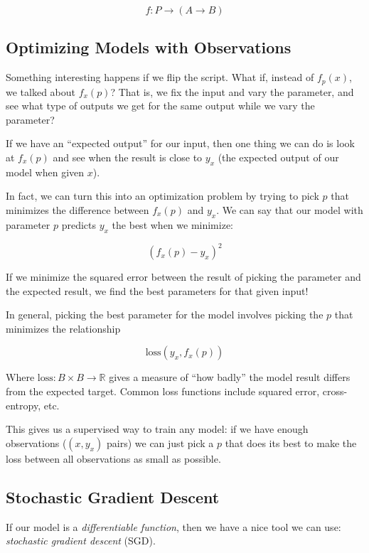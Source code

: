 \documentclass[]{article}
\begin{document}
\[
f : P \rightarrow (A \rightarrow B)
\]

\subsection{Optimizing Models with
Observations}\label{optimizing-models-with-observations}

Something interesting happens if we flip the script. What if, instead of
\(f_p(x)\), we talked about \(f_x(p)\)? That is, we fix the input and vary the
parameter, and see what type of outputs we get for the same output while we vary
the parameter?

If we have an ``expected output'' for our input, then one thing we can do is
look at \(f_x(p)\) and see when the result is close to \(y_x\) (the expected
output of our model when given \(x\)).

In fact, we can turn this into an optimization problem by trying to pick \(p\)
that minimizes the difference between \(f_x(p)\) and \(y_x\). We can say that
our model with parameter \(p\) predicts \(y_x\) the best when we minimize:

\[
(f_x(p) - y_x)^2
\]

If we minimize the squared error between the result of picking the parameter and
the expected result, we find the best parameters for that given input!

In general, picking the best parameter for the model involves picking the \(p\)
that minimizes the relationship

\[
\text{loss}(y_x, f_x(p))
\]

Where \(\text{loss} : B \times B \rightarrow \mathbb{R}\) gives a measure of
``how badly'' the model result differs from the expected target. Common loss
functions include squared error, cross-entropy, etc.

This gives us a supervised way to train any model: if we have enough
observations (\((x, y_x)\) pairs) we can just pick a \(p\) that does its best to
make the loss between all observations as small as possible.

\subsection{Stochastic Gradient Descent}\label{stochastic-gradient-descent}

If our model is a \emph{differentiable function}, then we have a nice tool we
can use: \emph{stochastic gradient descent} (SGD).
\end{document}
